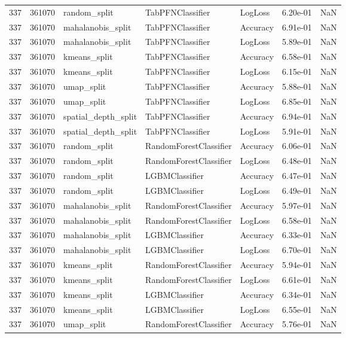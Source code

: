 \begin{tabular}{rrlllrr}
337 & 361070 & random\_split & TabPFNClassifier & LogLoss & 6.20e-01 & NaN \\
337 & 361070 & mahalanobis\_split & TabPFNClassifier & Accuracy & 6.91e-01 & NaN \\
337 & 361070 & mahalanobis\_split & TabPFNClassifier & LogLoss & 5.89e-01 & NaN \\
337 & 361070 & kmeans\_split & TabPFNClassifier & Accuracy & 6.58e-01 & NaN \\
337 & 361070 & kmeans\_split & TabPFNClassifier & LogLoss & 6.15e-01 & NaN \\
337 & 361070 & umap\_split & TabPFNClassifier & Accuracy & 5.88e-01 & NaN \\
337 & 361070 & umap\_split & TabPFNClassifier & LogLoss & 6.85e-01 & NaN \\
337 & 361070 & spatial\_depth\_split & TabPFNClassifier & Accuracy & 6.94e-01 & NaN \\
337 & 361070 & spatial\_depth\_split & TabPFNClassifier & LogLoss & 5.91e-01 & NaN \\
337 & 361070 & random\_split & RandomForestClassifier & Accuracy & 6.06e-01 & NaN \\
337 & 361070 & random\_split & RandomForestClassifier & LogLoss & 6.48e-01 & NaN \\
337 & 361070 & random\_split & LGBMClassifier & Accuracy & 6.47e-01 & NaN \\
337 & 361070 & random\_split & LGBMClassifier & LogLoss & 6.49e-01 & NaN \\
337 & 361070 & mahalanobis\_split & RandomForestClassifier & Accuracy & 5.97e-01 & NaN \\
337 & 361070 & mahalanobis\_split & RandomForestClassifier & LogLoss & 6.58e-01 & NaN \\
337 & 361070 & mahalanobis\_split & LGBMClassifier & Accuracy & 6.33e-01 & NaN \\
337 & 361070 & mahalanobis\_split & LGBMClassifier & LogLoss & 6.70e-01 & NaN \\
337 & 361070 & kmeans\_split & RandomForestClassifier & Accuracy & 5.94e-01 & NaN \\
337 & 361070 & kmeans\_split & RandomForestClassifier & LogLoss & 6.61e-01 & NaN \\
337 & 361070 & kmeans\_split & LGBMClassifier & Accuracy & 6.34e-01 & NaN \\
337 & 361070 & kmeans\_split & LGBMClassifier & LogLoss & 6.55e-01 & NaN \\
337 & 361070 & umap\_split & RandomForestClassifier & Accuracy & 5.76e-01 & NaN \\

\end{tabular}

